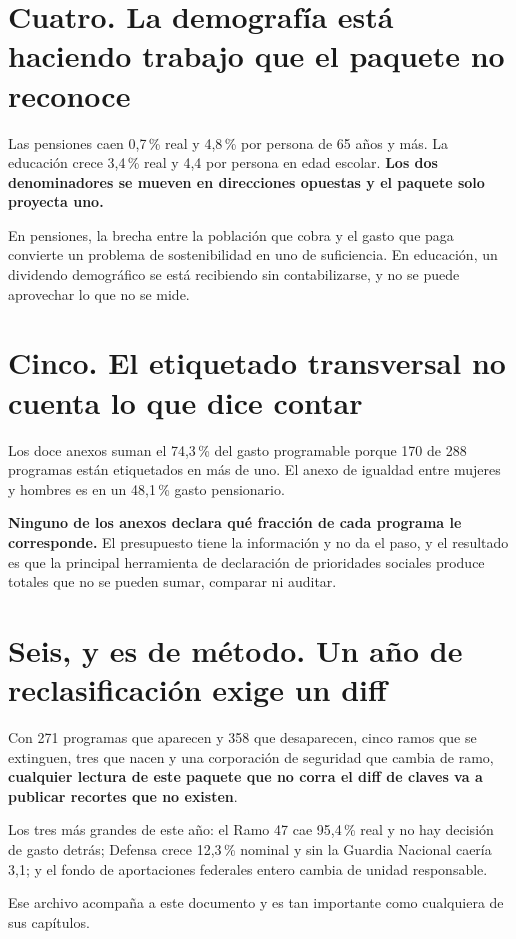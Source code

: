 \section*{Cuatro. La demografía está haciendo trabajo que el paquete no reconoce}

Las pensiones caen 0,7\,\% real y 4,8\,\% por persona de 65 años y más. La educación crece
3,4\,\% real y 4,4 por persona en edad escolar. \textbf{Los dos denominadores se mueven en
direcciones opuestas y el paquete solo proyecta uno.}

En pensiones, la brecha entre la población que cobra y el gasto que paga convierte un problema
de sostenibilidad en uno de suficiencia. En educación, un dividendo demográfico se está
recibiendo sin contabilizarse, y no se puede aprovechar lo que no se mide.

\section*{Cinco. El etiquetado transversal no cuenta lo que dice contar}

Los doce anexos suman el 74,3\,\% del gasto programable porque 170 de 288 programas están
etiquetados en más de uno. El anexo de igualdad entre mujeres y hombres es en un 48,1\,\%
gasto pensionario.

\textbf{Ninguno de los anexos declara qué fracción de cada programa le corresponde.} El
presupuesto tiene la información y no da el paso, y el resultado es que la principal
herramienta de declaración de prioridades sociales produce totales que no se pueden sumar,
comparar ni auditar.

\section*{Seis, y es de método. Un año de reclasificación exige un diff}

Con 271 programas que aparecen y 358 que desaparecen, cinco ramos que se extinguen, tres que
nacen y una corporación de seguridad que cambia de ramo, \textbf{cualquier lectura de este
paquete que no corra el diff de claves va a publicar recortes que no existen}.

Los tres más grandes de este año: el Ramo 47 cae 95,4\,\% real y no hay decisión de gasto
detrás; Defensa crece 12,3\,\% nominal y sin la Guardia Nacional caería 3,1; y el fondo de
aportaciones federales entero cambia de unidad responsable.

Ese archivo acompaña a este documento y es tan importante como cualquiera de sus capítulos.
\clearpage
